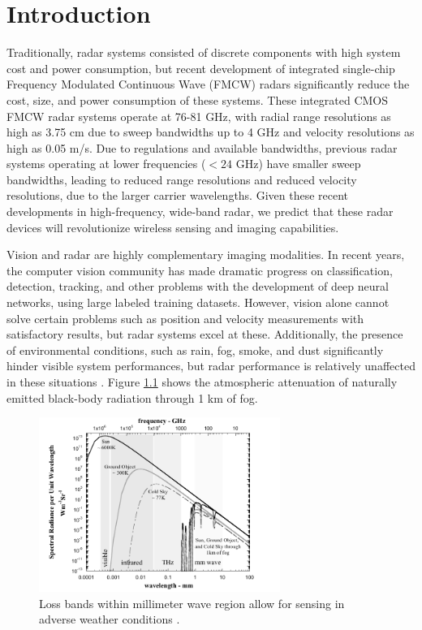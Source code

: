 \chapter{Introduction}
Traditionally, radar systems consisted of discrete components with high system
cost and power consumption, but recent development of integrated single-chip
Frequency Modulated Continuous Wave (FMCW) radars significantly reduce the cost,
size, and power consumption of these systems. These
integrated CMOS FMCW radar systems operate at 76-81 GHz, with radial range resolutions
as high as 3.75 cm due to sweep bandwidths up to 4 GHz and velocity resolutions
as high as 0.05 m/s. Due to regulations and available bandwidths,
previous radar systems operating at lower frequencies ($<24$ GHz) have smaller
sweep bandwidths, leading to reduced range resolutions and reduced velocity
resolutions, due to the larger carrier wavelengths. Given these recent developments in
high-frequency, wide-band radar, we predict that these radar devices will
revolutionize wireless sensing and imaging capabilities. 


Vision and radar are highly complementary imaging modalities. In recent years,
the computer vision community has made dramatic progress on classification,
detection, tracking, and other problems with the development of deep neural
networks, using large labeled training datasets. However, vision alone cannot
solve certain problems such as position and velocity measurements with
satisfactory results, but radar systems excel at these. Additionally, the
presence of environmental conditions, such as rain, fog, smoke, and dust
significantly hinder visible system performances, but radar performance is
relatively unaffected in these situations \cite{patel2016computational}. Figure \ref{fig:attentuation} shows the atmospheric
attenuation of naturally emitted black-body radiation through 1 km of fog. 

\begin{figure}[h]
	\centering
	\includegraphics[width=0.7\textwidth]{imgs/attenuation}
	\caption{Loss bands within millimeter wave region allow for sensing in
	adverse weather conditions \cite{patel2016computational}.}
	\label{fig:attentuation}
\end{figure}
